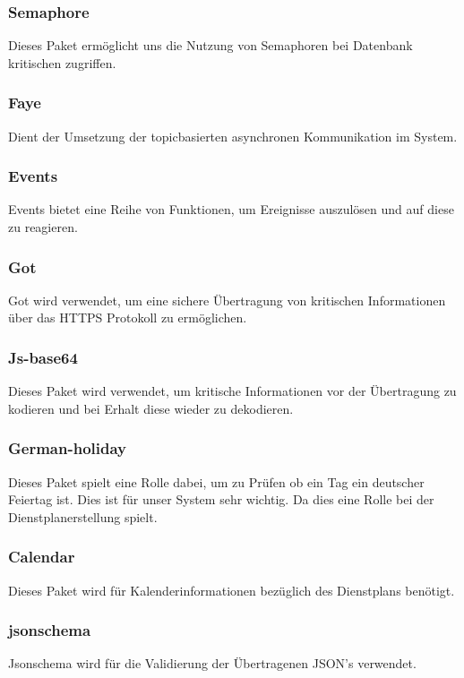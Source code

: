 \documentclass[11pt,
paper=a4,
bibtotocnumbered,	  %
liststotocnumbered,  %
DIV=calc,		  %
tablecaptionabove,	  %
headinclude,
]{article}
\begin{document}
\subsubsection{Semaphore}
Dieses Paket ermöglicht uns die Nutzung von Semaphoren bei Datenbank kritischen zugriffen. 
\subsubsection{Faye}
Dient der Umsetzung der topicbasierten asynchronen Kommunikation im System.
\subsubsection{Events}
Events bietet eine Reihe von Funktionen, um Ereignisse auszulösen und auf diese zu reagieren.
\subsubsection{Got}
Got wird verwendet, um eine sichere Übertragung von kritischen Informationen über das HTTPS Protokoll zu ermöglichen.
\subsubsection{Js-base64}
Dieses Paket wird verwendet, um kritische Informationen vor der Übertragung zu kodieren und bei Erhalt diese wieder zu dekodieren.
\subsubsection{German-holiday}
Dieses Paket spielt eine Rolle dabei, um zu Prüfen ob ein Tag ein deutscher Feiertag ist. Dies ist für unser System sehr wichtig. Da dies eine Rolle bei der Dienstplanerstellung spielt.
\subsubsection{Calendar}
Dieses Paket wird für Kalenderinformationen bezüglich des Dienstplans benötigt. 
\subsubsection{jsonschema}
Jsonschema wird für die Validierung der Übertragenen JSON's verwendet.
\end{document}
